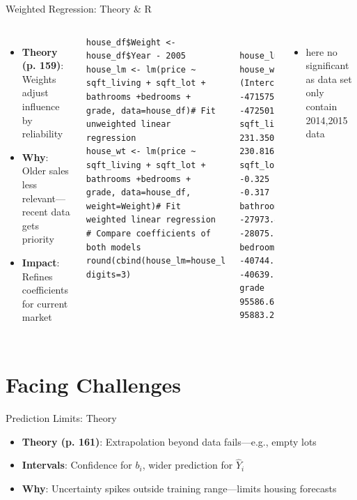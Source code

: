 \documentclass{beamer}
\begin{document}
	\begin{frame}[fragile]{Weighted Regression: Theory \& R}
		\begin{columns}
			\begin{itemize}
				\item \textbf{Theory (p. 159)}: Weights adjust influence by reliability
				\item \textbf{Why}: Older sales less relevant—recent data gets priority
				\item \textbf{Impact}: Refines coefficients for current market
			\end{itemize}
			\begin{lstlisting}
house_df$Weight <- house_df$Year - 2005
house_lm <- lm(price ~ sqft_living + sqft_lot + bathrooms +bedrooms + grade, data=house_df)# Fit unweighted linear regression
house_wt <- lm(price ~ sqft_living + sqft_lot + bathrooms +bedrooms + grade, data=house_df, weight=Weight)# Fit weighted linear regression
# Compare coefficients of both models
round(cbind(house_lm=house_lm$coefficients,house_wt=house_wt$coefficients), digits=3)
			\end{lstlisting}
			\begin{lstlisting}
               house_lm    house_wt
(Intercept) -471575.692 -472501.632
sqft_living     231.350     230.816
sqft_lot         -0.325      -0.317
bathrooms    -27973.439  -28075.162
bedrooms     -40744.142  -40639.355
grade         95586.697   95883.234
\end{lstlisting}
	\begin{itemize}
	\item here no significant as data set only contain 2014,2015 data
\end{itemize}
		\end{columns}
	\end{frame}
	
	
	\section{Facing Challenges}
	
	\begin{frame}{Prediction Limits: Theory}
		\begin{itemize}
			\item \textbf{Theory (p. 161)}: Extrapolation beyond data fails—e.g., empty lots
			\item \textbf{Intervals}: Confidence for $b_i$, wider prediction for $\hat{Y}_i$
			\item \textbf{Why}: Uncertainty spikes outside training range—limits housing forecasts
		\end{itemize}
	\end{frame}
	
\end{document}
